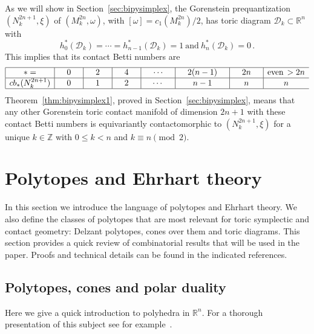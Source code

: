 \documentclass[a4paper,11pt,reqno]{amsart}
\newcommand{\R}{\mathbb R}
\newcommand{\Z}{\mathbb Z}
\newcommand{\Dd}{{\mathcal D}}
\begin{document}
As we will show in Section~\ref{sec:bipysimplex}, the Gorenstein prequantization $(N^{2n+1}_k,\xi)$ of 
$(M^{2n}_k, \omega)$, with $[\omega] = c_1 (M_k^{2n}) /2$, has toric diagram $\Dd_k \subset \R^n$ with
\[
h^\ast_0 (\Dd_k) = \cdots = h^\ast_{n-1} (\Dd_k) =1 \  \text{and}\ h^\ast_n (\Dd_k) = 0\,.
\]
This implies that its contact Betti numbers are
\begin{equation*}
\begin{array}{|c|c|c|c|c|c|c|cl} \hline
  \ast =  & \quad   0 \quad  & \quad 2 \quad & \quad 4 \quad & \quad \cdots \quad & \quad 2(n-1) \quad & \quad 2n \quad & \text{even}\, > 2n
\\ 
\hline 
cb_\ast (N^{2n+1}_k) &   0   & 1 & 2 & \cdots & n-1 & n &  n
\\
\hline
\end{array}
\end{equation*}
Theorem~\ref{thm:bipysimplex1}, proved in Section~\ref{sec:bipysimplex}, means that any other Gorenstein toric contact manifold 
of dimension $2n+1$ with these contact Betti numbers is equivariantly contactomorphic to $(N^{2n+1}_k,\xi)$ for a unique $k\in\Z$ 
with $0\leq k < n$ and $k\equiv n \pmod 2$.

\section{Polytopes and Ehrhart theory}
\label{sec:polyEhrhart}

In this section we introduce the language of polytopes and Ehrhart theory. We also define the classes of polytopes 
that are most relevant for toric symplectic and contact geometry: Delzant polytopes, cones over them and toric 
diagrams. This section provides a quick review of combinatorial results that will be used in the paper. Proofs and 
technical details can be found in the indicated references.

\subsection{Polytopes, cones and polar duality}
\label{ssec:PCPD}

Here we give a quick introduction to polyhedra in $\mathbb{R}^n$. For a thorough presentation of this subject see 
for example~\cite{Z}.
\end{document}
